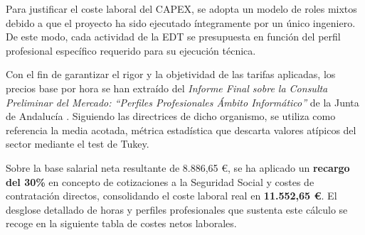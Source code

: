 \begin{table}[H]
\centering
\small
\renewcommand{\arraystretch}{1.4}
\caption{Resumen de Gastos de Capital (CAPEX).}
\label{tab:resumen_capex}
\end{table}

Para justificar el coste laboral del CAPEX, se adopta un modelo de roles mixtos debido a que el proyecto ha sido ejecutado íntegramente por un único ingeniero. De este modo, cada actividad de la EDT se presupuesta en función del perfil profesional específico requerido para su ejecución técnica.

Con el fin de garantizar el rigor y la objetividad de las tarifas aplicadas, los precios base por hora se han extraído del \textit{Informe Final sobre la Consulta Preliminar del Mercado: ``Perfiles Profesionales Ámbito Informático''} de la Junta de Andalucía \cite{juntaTIC2018}. Siguiendo las directrices de dicho organismo, se utiliza como referencia la media acotada, métrica estadística que descarta valores atípicos del sector mediante el test de Tukey.

Sobre la base salarial neta resultante de 8.886,65 \euro, se ha aplicado un \textbf{recargo del 30\%} en concepto de cotizaciones a la Seguridad Social y costes de contratación directos, consolidando el coste laboral real en \textbf{11.552,65 \euro}. El desglose detallado de horas y perfiles profesionales que sustenta este cálculo se recoge en la siguiente tabla de costes netos laborales.

